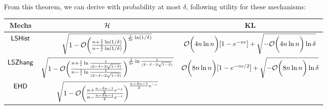 \documentclass{article}
\begin{document}
From this theorem, we can derive with probability at most $\delta$, following utility for these mechanisms:
\begin{center}
 \begin{tabular}{||c| c| c||} 
 \hline
 Mechs  & $\mathcal{H}$ & KL  \\ 
 \hline\hline
 $\mathsf{LSHist}$ 
 & $\sqrt{1 - 
 \mathcal{O}\bigg( \frac{ n + \frac{1}{\epsilon}\ln(1/\delta) }
          {n - \frac{1}{\epsilon}\ln(1/\delta)} \bigg)
          ^{\frac{1}{2\epsilon}\ln(1/\delta)}
          }$ 
&  $\mathcal{O}\bigg( 4 n\ln n \bigg)[1 - e^{-n\epsilon}] + \sqrt{-\mathcal{O}\bigg( 4 n\ln n \bigg)\ln\delta}$  \\ 
 \hline
 $\mathsf{LSZhang}$ & $\sqrt{1 - 
 \mathcal{O}\bigg( \frac{ n + \frac{1}{\epsilon}\ln \frac{1}{(2 - \delta - 2 \sqrt{1 - \delta})} }
          {n - \frac{1}{\epsilon}\ln \frac{1}{(2 - \delta - 2 \sqrt{1 - \delta})}} \bigg)
          ^{\frac{1}{2\epsilon}\ln \frac{1}{(2 - \delta - 2 \sqrt{1 - \delta})}}
          }$ 
& $\mathcal{O}\bigg( 8 n\ln n \bigg)[1 - e^{-n\epsilon/2}] + \sqrt{-\mathcal{O}\bigg( 8 n\ln n \bigg)\ln\delta}$   \\ 
 \hline
 $\mathsf{EHD}$ & $\sqrt{1 - 
 \mathcal{O}\bigg( \frac{ n + \frac{n - \delta n - 1}{2}e^{-\epsilon} }
          {n - \frac{n - \delta n - 1}{2}e^{-\epsilon}} \bigg)
          ^{\frac{n - \delta n - 1}{2}e^{-\epsilon}}
          }$ 
&    \\ 
 \hline
 \hline
\end{tabular}
\end{center}


\small{
}
\end{document}
